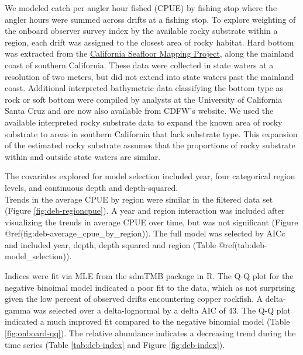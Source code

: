 \documentclass[11pt,
  english,
  letterpaper,
]{article}
\begin{document}
We modeled catch per angler hour fished (CPUE) by fishing stop where the angler hours were summed across drifts at a fishing stop. To explore weighting of the onboard observer survey index by the available rocky substrate within a region, each drift was assigned to the closest area of rocky habitat. Hard bottom was extracted from the \href{http://seafloor.otterlabs.org/index.html}{California Seafloor Mapping Project}, along the mainland coast of southern California. These data were collected in state waters at a resolution of two meters, but did not extend into state waters past the mainland coast. Additional interpreted bathymetric data classifying the bottom type as rock or soft bottom were compiled by analysts at the University of California Santa Cruz and are now also available from CDFW's website. We used the available interpreted rocky substrate data to expand the known area of rocky substrate to areas in southern California that lack substrate type. This expansion of the estimated rocky substrate assumes that the proportions of rocky substrate within and outside state waters are similar.

The covariates explored for model selection included year, four categorical region levels, and continuous depth and depth-squared.\\
Trends in the average CPUE by region were similar in the filtered data set (Figure \ref{fig:deb-regioncpue}). A year and region interaction was included after visualizing the trends in average CPUE over time, but was not significant (Figure @ref(fig:deb-average\_cpue\_by\_region)). The full model was selected by AICc and included year, depth, depth squared and region (Table @ref(tab:deb-model\_selection)).

Indices were fit via MLE from the sdmTMB package in R. The Q-Q plot for the negative binoimal model indicated a poor fit to the data, which as not surprising given the low percent of observed drifts encountering copper rockfish. A delta-gamma was selected over a delta-lognormal by a delta AIC of 43. The Q-Q plot indicated a much improved fit compared to the negative binomial model (Table \ref{fig:onboard-qq}). The relative abundance indicates a decreasing trend during the time series (Table \ref{tab:deb-index} and Figure \ref{fig:deb-index}).

\begingroup\fontsize{10}{12}\selectfont
\begingroup\fontsize{10}{12}\selectfont
\end{document}
